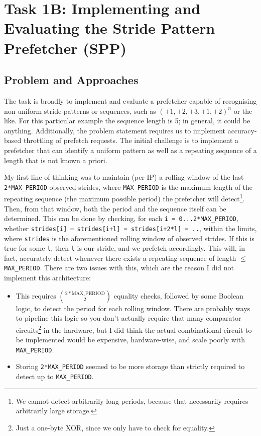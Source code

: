 \documentclass[11pt]{article}
\begin{document}
\section{Task 1B: Implementing and Evaluating the Stride Pattern Prefetcher (SPP)}
\subsection{Problem and Approaches}
\par
The task is broadly to implement and evaluate a prefetcher capable of recognising non-uniform stride patterns or sequences, such as $(+1, +2, +3,+1,+2)^n$ or the like. For this particular example the sequence length is 5; in general, it could be anything. Additionally, the problem statement requires us to implement accuracy-based throttling of prefetch requests. The initial challenge is to implement a prefetcher that can identify a uniform pattern as well as a repeating sequence of a length that is not known a priori.
\par
My first line of thinking was to maintain (per-IP) a rolling window of the last \verb|2*MAX_PERIOD| observed strides, where \verb|MAX_PERIOD| is the maximum length of the repeating sequence (the maximum possible period) the prefetcher will detect\footnote{We cannot detect arbitrarily long periods, because that necessarily requires arbitrarily large storage.}. Then, from that window, both the period and the sequence itself can be determined. This can be done by checking, for each  \verb|i = 0...2*MAX_PERIOD|, whether \verb|strides[i]| = \verb|strides[i+l] = strides[i+2*l] = ..|, within the limits, where \verb|strides| is the aforementioned rolling window of observed strides. If this is true for some \verb|l|, then \verb|l| is our stride, and we prefetch accordingly. This will, in fact, accurately detect whenever there exists a repeating sequence of length $\le$ \verb|MAX_PERIOD|. There are two issues with this, which are the reason I did not implement this architecture:
\begin{itemize}
    \item[--] This requires $2*\text{MAX\_PERIOD}\choose2$ equality checks, followed by some Boolean logic, to detect the period for each rolling window. There are probably ways to pipeline this logic so you don't actually require that many comparator circuits\footnote{Just a one-byte XOR, since we only have to check for equality.} in the hardware, but I did think the actual combinational circuit to be implemented would be expensive, hardware-wise, and scale poorly with \verb|MAX_PERIOD|.
    \item[--] Storing \verb|2*MAX_PERIOD| seemed to be more storage than strictly required to detect up to \verb|MAX_PERIOD|.
\end{itemize}
\end{document}
